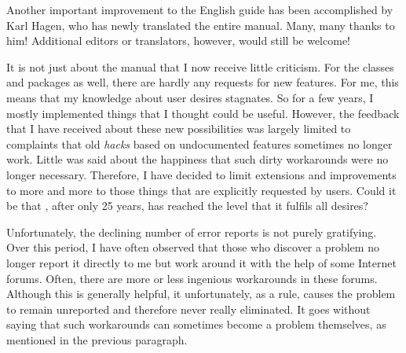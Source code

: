 Another important improvement to the English guide has been accomplished by
Karl Hagen, who has newly translated the entire manual. Many, many thanks to
him! Additional editors or translators, however, would still be welcome!


It is not just about the manual that I now receive little criticism. For the
classes and packages as well, there are hardly any requests for new features.
For me, this means that my knowledge about user desires stagnates. So for a
few years, I mostly implemented things that I thought could be useful.
However, the feedback that I have received about these new possibilities was
largely limited to complaints that old \emph{hacks} based on undocumented
\KOMAScript{} features sometimes no longer work. Little was said about the
happiness that such dirty workarounds were no longer necessary. Therefore, I
have decided to limit extensions and improvements to \KOMAScript{} more and
more to those things that are explicitly requested by users. Could it be that
\KOMAScript{}, after only 25 years, has reached the level that it fulfils all
desires?

Unfortunately, the declining number of error reports is not purely gratifying.
Over this period, I have often observed that those who discover a problem no
longer report it directly to me but work around it with the help of some
Internet forums. Often, there are more or less ingenious workarounds in these
forums. Although this is generally helpful, it unfortunately, as a rule,
causes the problem to remain unreported and therefore never really eliminated.
It goes without saying that such workarounds can sometimes become a problem
themselves, as mentioned in the previous paragraph.

